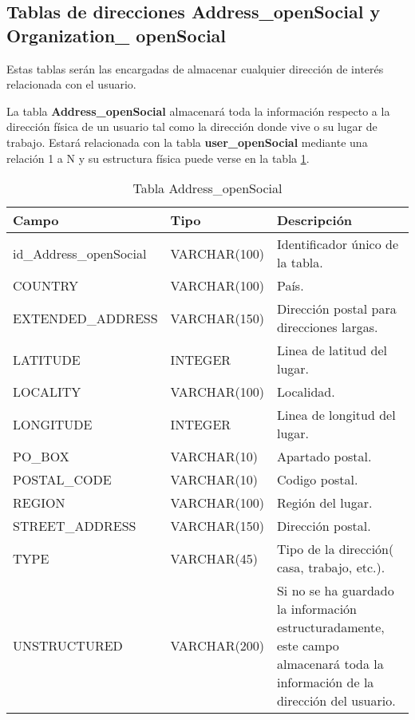 \subsection{Tablas de direcciones Address\_openSocial y Organization\_ openSocial}
Estas tablas serán las encargadas de almacenar cualquier dirección de interés relacionada con el usuario. 
\bigskip
\par
La tabla \textbf{Address\_openSocial} almacenará toda la información respecto a la dirección física de un usuario tal como la dirección donde vive o su lugar de trabajo. Estará relacionada con la tabla \textbf{user\_openSocial} mediante una relación 1 a N y su estructura física puede verse en la tabla \ref{tabAddressOpenSocial}.
\bigskip
\par
\begin{table}[h]
\begin{center}
\begin{tabular}{| l | l | p{60mm} |}\hline
\textbf{Campo}&\textbf{Tipo}&\textbf{Descripción} \\ \hline
id\_Address\_openSocial & VARCHAR(100) & Identificador único de la tabla. \\ \hline
COUNTRY & VARCHAR(100) & País. \\ \hline
EXTENDED\_ADDRESS & VARCHAR(150) &  Dirección postal para direcciones largas.\\ \hline
LATITUDE & INTEGER & Linea de latitud del lugar. \\ \hline
LOCALITY & VARCHAR(100) & Localidad. \\ \hline
LONGITUDE & INTEGER &  Linea de longitud del lugar. \\ \hline
PO\_BOX & VARCHAR(10) &  Apartado postal. \\ \hline
POSTAL\_CODE & VARCHAR(10) &  Codigo postal. \\ \hline
REGION & VARCHAR(100) & Región del lugar. \\ \hline
STREET\_ADDRESS & VARCHAR(150) & Dirección postal.  \\ \hline
TYPE & VARCHAR(45) &  Tipo de la dirección( casa, trabajo, etc.). \\ \hline
UNSTRUCTURED & VARCHAR(200) & Si no se ha guardado la información estructuradamente, este campo almacenará toda la información de la dirección del usuario. \\ \hline
\end{tabular}
\end{center}
\caption{Tabla Address\_openSocial} \label{tabAddressOpenSocial}
\end{table}
